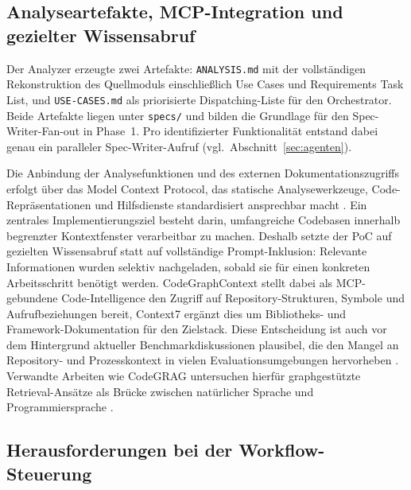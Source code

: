 \subsection{Analyseartefakte, MCP-Integration und gezielter Wissensabruf}

Der Analyzer erzeugte zwei Artefakte: \texttt{ANALYSIS.md} mit der vollständigen Rekonstruktion des Quellmoduls einschließlich Use Cases und Requirements Task List, und \texttt{USE-CASES.md} als priorisierte Dispatching-Liste für den Orchestrator. Beide Artefakte liegen unter \texttt{specs/} und bilden die Grundlage für den Spec-Writer-Fan-out in Phase~1. Pro identifizierter Funktionalität entstand dabei genau ein paralleler Spec-Writer-Aufruf (vgl.\ Abschnitt~\ref{sec:agenten}).

Die Anbindung der Analysefunktionen und des externen Dokumentationszugriffs erfolgt über das Model Context Protocol, das statische Analysewerkzeuge, Code-Repräsentationen und Hilfsdienste standardisiert ansprechbar macht \parencite{mcpdocs}. Ein zentrales Implementierungsziel besteht darin, umfangreiche Codebasen innerhalb begrenzter Kontextfenster verarbeitbar zu machen. Deshalb setzte der PoC auf gezielten Wissensabruf statt auf vollständige Prompt-Inklusion: Relevante Informationen wurden selektiv nachgeladen, sobald sie für einen konkreten Arbeitsschritt benötigt werden. CodeGraphContext stellt dabei als MCP-gebundene Code-Intelligence den Zugriff auf Repository-Strukturen, Symbole und Aufrufbeziehungen bereit, Context7 ergänzt dies um Bibliotheks- und Framework-Dokumentation für den Zielstack. Diese Entscheidung ist auch vor dem Hintergrund aktueller Benchmarkdiskussionen plausibel, die den Mangel an Repository- und Prozesskontext in vielen Evaluationsumgebungen hervorheben \parencite{rodriguezcardenas2026behelm}. Verwandte Arbeiten wie CodeGRAG untersuchen hierfür graphgestützte Retrieval-Ansätze als Brücke zwischen natürlicher Sprache und Programmiersprache \parencite{du2024codegrag}.

\subsection{Herausforderungen bei der Workflow-Steuerung}

